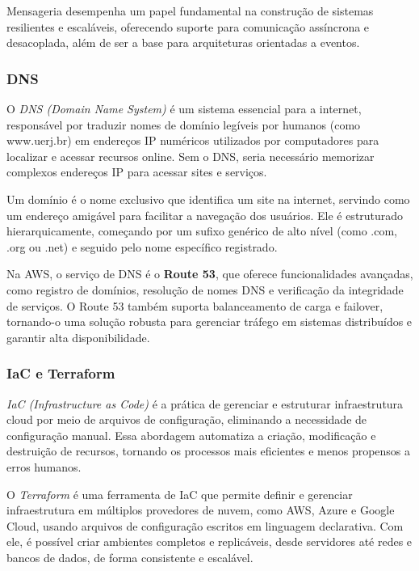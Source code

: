 Mensageria desempenha um papel fundamental na construção de sistemas resilientes e escaláveis, oferecendo suporte para comunicação assíncrona e desacoplada, além de ser a base para arquiteturas orientadas a eventos.

\subsubsection{DNS}


O \emph{DNS (Domain Name System)} é um sistema essencial para a internet, responsável por traduzir nomes de domínio legíveis por humanos (como www.uerj.br) em endereços IP numéricos utilizados por computadores para localizar e acessar recursos online. Sem o DNS, seria necessário memorizar complexos endereços IP para acessar sites e serviços.

Um domínio é o nome exclusivo que identifica um site na internet, servindo como um endereço amigável para facilitar a navegação dos usuários. Ele é estruturado hierarquicamente, começando por um sufixo genérico de alto nível (como .com, .org ou .net) e seguido pelo nome específico registrado.

Na AWS, o serviço de DNS é o \textbf{Route 53}, que oferece funcionalidades avançadas, como registro de domínios, resolução de nomes DNS e verificação da integridade de serviços. O Route 53 também suporta balanceamento de carga e failover, tornando-o uma solução robusta para gerenciar tráfego em sistemas distribuídos e garantir alta disponibilidade.

\subsubsection{IaC e Terraform}


\emph{IaC (Infrastructure as Code)} é a prática de gerenciar e estruturar infraestrutura cloud por meio de arquivos de configuração, eliminando a necessidade de configuração manual. Essa abordagem automatiza a criação, modificação e destruição de recursos, tornando os processos mais eficientes e menos propensos a erros humanos.

O \emph{Terraform} é uma ferramenta de IaC que permite definir e gerenciar infraestrutura em múltiplos provedores de nuvem, como AWS, Azure e Google Cloud, usando arquivos de configuração escritos em linguagem declarativa. Com ele, é possível criar ambientes completos e replicáveis, desde servidores até redes e bancos de dados, de forma consistente e escalável.

